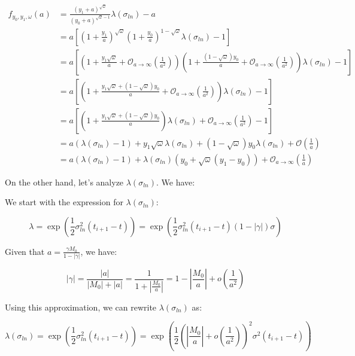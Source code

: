 \documentclass{article}
\begin{document}
\begin{align*}
f_{y_0, y_1, \omega}(a) &= \frac{(y_1 + a)^{\sqrt \omega}}{(y_0 + a)^{\sqrt \omega - 1}} \lambda(\sigma_{ln}) - a \\
&= a \left[\left(1 + \frac{y_1}{a} \right)^{\sqrt \omega} \left(1 + \frac{y_0}{a} \right)^{1 - \sqrt \omega} \lambda(\sigma_{ln}) - 1\right] \\
&= a \left[\left( 1 + \frac{y_1 \sqrt \omega}{a} + \mathcal{O}_{a \to \infty}\left(\frac{1}{a^2}\right)\right) \left(1 + \frac{(1-\sqrt \omega) y_0}{a} + \mathcal{O}_{a \to \infty}\left(\frac{1}{a^2}\right)\right) \lambda(\sigma_{ln}) - 1 \right] \\
&= a \left[ \left( 1 + \frac{y_1 \sqrt \omega + (1-\sqrt \omega) y_0}{a} + \mathcal{O}_{a \to \infty}\left(\frac{1}{a^2}\right) \right) \lambda(\sigma_{ln}) - 1\right] \\
&= a \left[ \left(1 + \frac{y_1 \sqrt \omega + (1-\sqrt \omega) y_0}{a} \right) \lambda(\sigma_{ln}) + \mathcal{O}_{a \to \infty}\left(\frac{1}{a^2}\right) - 1\right] \\
&= a (\lambda(\sigma_{ln}) - 1) + y_1 \sqrt \omega \lambda(\sigma_{ln}) + (1 - \sqrt \omega) y_0 \lambda(\sigma_{ln}) + \mathcal{O}\left(\frac{1}{a}\right)\\
&= a (\lambda(\sigma_{ln}) - 1) + \lambda(\sigma_{ln})(y_0 + \sqrt{\omega}(y_1 - y_0)) + \mathcal{O}_{a \to \infty}\left(\frac{1}{a}\right)
\end{align*}

On the other hand, let's analyze \(\lambda(\sigma_{ln})\). We have:

We start with the expression for \(\lambda(\sigma_{ln})\):

$$
\lambda = \exp\left(\frac{1}{2} \sigma_{ln}^2 (t_{i+1} - t)\right) = \exp\left(\frac{1}{2} \sigma_{ln}^2 (t_{i+1} - t) (1 - |\gamma|) \sigma\right)
$$

Given that \(a = \frac{\gamma M_0}{1 - |\gamma|}\), we have:

$$
|\gamma| = \frac{\left|a\right|}{\left|M_0\right| + \left|a\right|} = \frac{1}{1 + \left|\frac{M_0}{a}\right|} = 1 - \left|\frac{M_0}{a}\right| + o\left(\frac{1}{a^2}\right)
$$

Using this approximation, we can rewrite \(\lambda(\sigma_{ln})\) as:

$$
\lambda(\sigma_{ln}) = \exp\left(\frac{1}{2} \sigma_{ln}^2 (t_{i+1} - t)\right) = \exp\left(\frac{1}{2} \left(\left|\frac{M_0}{a}\right| + o\left(\frac{1}{a^2}\right)\right)^2 \sigma^2 (t_{i+1} - t)\right)
$$
\end{document}
